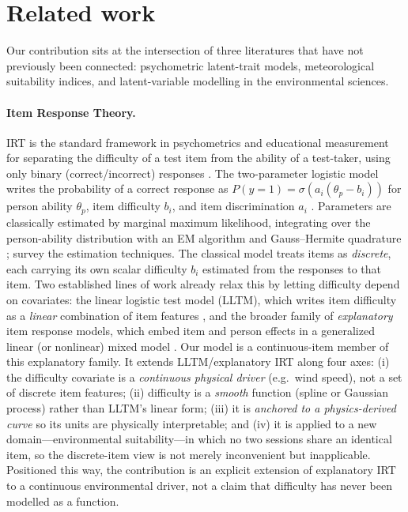 \section{Related work}
\label{sec:related}

Our contribution sits at the intersection of three literatures that have not
previously been connected: psychometric latent-trait models, meteorological
suitability indices, and latent-variable modelling in the environmental sciences.

\paragraph{Item Response Theory.} IRT is the standard framework in psychometrics
and educational measurement for separating the difficulty of a test item from the
ability of a test-taker, using only binary (correct/incorrect) responses
\citep{lord1968,rasch1960,embretson2000}. The two-parameter logistic model writes
the probability of a correct response as
$P(y{=}1) = \sigma\!\left(a_i(\theta_p - b_i)\right)$ for person ability
$\theta_p$, item difficulty $b_i$, and item discrimination $a_i$
\citep{birnbaum1968}. Parameters are classically estimated by marginal maximum
likelihood, integrating over the person-ability distribution with an EM algorithm
and Gauss--Hermite quadrature \citep{bock1981}; \citet{bakerkim2004} survey the
estimation techniques. The classical model treats items as \emph{discrete}, each
carrying its own scalar difficulty $b_i$ estimated from the responses to that
item. Two established lines of work already relax this by letting difficulty
depend on covariates: the linear logistic test model (LLTM), which writes item
difficulty as a \emph{linear} combination of item features \citep{fischer1973},
and the broader family of \emph{explanatory} item response models, which embed
item and person effects in a generalized linear (or nonlinear) mixed model
\citep{deboeck2004}. Our model is a continuous-item member of this explanatory
family. It extends LLTM/explanatory IRT along four axes: (i) the difficulty
covariate is a \emph{continuous physical driver} (e.g.\ wind speed), not a set of
discrete item features; (ii) difficulty is a \emph{smooth} function (spline or
Gaussian process) rather than LLTM's linear form; (iii) it is \emph{anchored to a
physics-derived curve} so its units are physically interpretable; and (iv) it is
applied to a new domain---environmental suitability---in which no two sessions
share an identical item, so the discrete-item view is not merely inconvenient but
inapplicable. Positioned this way, the contribution is an explicit extension of
explanatory IRT to a continuous environmental driver, not a claim that difficulty
has never been modelled as a function.

